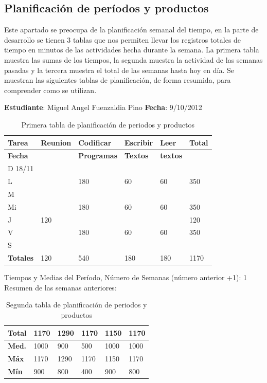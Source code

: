 \documentclass[a4paper,12pt,openany,oneside]{book}
\begin{document}
\subsection{Planificación de períodos y productos}
Este apartado se preocupa de la planificación semanal del tiempo, en la parte de desarrollo se tienen 3 tablas que nos permiten llevar los registros totales de tiempo en minutos de las actividades hecha durante la semana. La primera tabla muestra las sumas de los tiempos, la segunda muestra la actividad de las semanas pasadas y la tercera muestra el total de las semanas hasta hoy en día. Se muestran las siguientes tablas de planificación, de forma resumida, para comprender como se utilizan.

\begin{table}[!ht]
\textbf{Estudiante}: Miguel Angel Fuenzaldia Pino     \textbf{Fecha}: 9/10/2012\\
\begin{tabular}{| l | l | l | l | l | l |}
\hline
\textbf{Tarea} & \textbf{Reunion} & \textbf{Codificar} & \textbf{Escribir} & \textbf{Leer} & \textbf{Total} \\
\hline
\textbf{Fecha} &                  & \textbf{Programas} & \textbf{Textos} & \textbf{textos} & \\
\hline
D 18/11 & & & & & \\
\hline
L & & 180 & 60 & 60 & 350\\
\hline
M & & & & & \\
\hline
Mi & & 180 & 60 & 60 & 350\\
\hline
J & 120 & & & & 120\\
\hline
V & & 180 & 60 & 60 & 350\\
\hline
S & & & & & \\
\hline
\textbf{Totales} & 120 & 540 & 180 & 180 & 1170\\
\hline
\end{tabular}
\caption{Primera tabla de planificación de periodos y productos}
\end{table}

Tiempos y Medias del Período, Número de Semanas (número anterior +1): 1\\
Resumen de las semanas anteriores:
\begin{table}[!ht]
\begin{tabular}{| l | l | l | l | l | l |}
\hline
\textbf{Total} & 1170 & 1290 & 1170 & 1150 & 1170 \\
\hline
\textbf{Med.} & 1000 & 900 & 500 & 1000 & 1000 \\
\hline
\textbf{Máx} & 1170 & 1290 & 1170 & 1150 & 1170 \\
\hline
\textbf{Mín} & 900 & 800 & 400 & 900 & 800 \\
\hline
\end{tabular}
\caption{Segunda tabla de planificación de periodos y productos}
\end{table}
\end{document}
